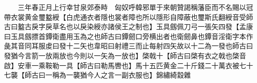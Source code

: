 　　三年春正月上行幸甘泉郊泰畤　匈奴呼韓邪單于來朝贊謁稱藩臣而不名賜以冠帶衣裳黄金璽盭綬【白虎通衣者隱也裳者障也所以隱形自障蔽也璽斯氏翻綬音受師古曰盭古戾字戾草名也以戾染綬亦諸侯王之制也】玉具劔佩刀弓一張矢四發【孟康曰玉具劔摽首鐔衛盡用玉為之也師古曰鐔劒口旁横出者也衛劒鼻也鐔音淫衛字本作彘其音同耳服䖍曰發十二矢也韋昭曰射禮三而止每射四矢故以十二為一發也師古曰發猶今言箭一放兩放也今則以一矢為一放也】棨戟十【師古曰棨有衣之戟也棨音啟】安車一乘鞍勒一具【師古曰勒馬轡也】馬十五匹黄金二十斤錢二十萬衣被七十七襲【師古曰一稱為一襲猶今人之言一副衣服也】錦繡綺縠雜